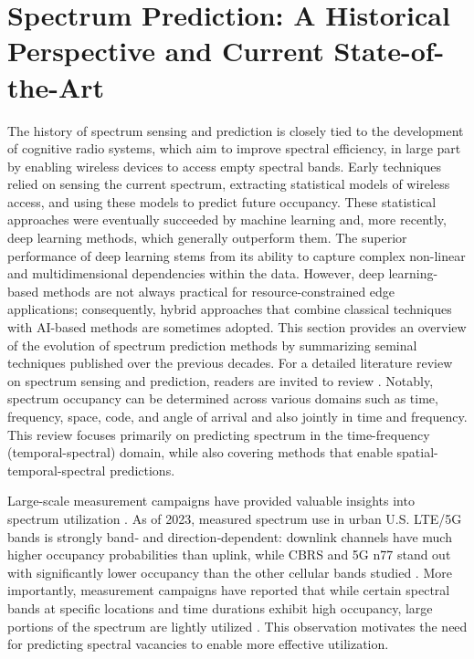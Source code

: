 \documentclass[lettersize,journal]{IEEEtran}
\begin{document}

\section{Spectrum Prediction: A Historical Perspective and Current State-of-the-Art}\label{sec:lit_review}
The history of spectrum sensing and prediction is closely tied to the development of cognitive radio systems, which aim to improve spectral efficiency, in large part by enabling wireless devices to access empty spectral bands. Early techniques relied on sensing the current spectrum, extracting statistical models of wireless access, and using these models to predict future occupancy. These statistical approaches were eventually succeeded by machine learning and, more recently, deep learning methods, which generally outperform them. The superior performance of deep learning stems from its ability to capture complex non-linear and multidimensional dependencies within the data. However, deep learning-based methods are not always practical for resource-constrained edge applications; consequently, hybrid approaches that combine classical techniques with AI-based methods are sometimes adopted. This section provides an overview of the evolution of spectrum prediction methods by summarizing seminal techniques published over the previous decades. For a detailed literature review on spectrum sensing and prediction, readers are invited to review \cite{Yucek_2009, He_2010, Xing_2013, Chen_2016, Ding_2017, Wang_2024}. Notably, spectrum occupancy can be determined across various domains such as time, frequency, space, code, and angle of arrival \cite{Yucek_2009} and also jointly in time and frequency. This review focuses primarily on predicting spectrum in the time-frequency (temporal-spectral) domain, while also covering methods that enable spatial-temporal-spectral predictions.

Large-scale measurement campaigns have provided valuable insights into spectrum utilization \cite{Chen_2016}. As of 2023, measured spectrum use in urban U.S. LTE/5G bands is strongly band‑ and direction‑dependent: downlink channels have much higher occupancy probabilities than uplink, while CBRS and 5G n77 stand out with significantly lower occupancy than the other cellular bands studied \cite{Raouf_2023}. More importantly, measurement campaigns have reported that while certain spectral bands at specific locations and time durations exhibit high occupancy, large portions of the spectrum are lightly utilized \cite{Wellens_2007, Engiz_2021, Kozlowski_2021}. This observation motivates the need for predicting spectral vacancies to enable more effective utilization. 
\end{document}
